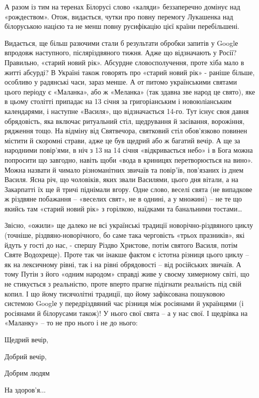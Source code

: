 А разом із тим на теренах Білорусі слово «каляди» беззаперечно домінує над
«рождеством». Отож, видається, чутки про повну перемогу Лукашенка над
білоруською нацією та не менш повну русифікацію цієї країни перебільшені.

Видається, ще більш разючими стали б результати обробки запитів у Googlе
впродовж наступного, післяріздвяного тижня. Адже що відзначають у Росії?
Правильно, «старий новий рік». Абсурдне словосполучення, проте хіба мало в
житті абсурді? В Україні також говорять про «старий новий рік» - раніше більше,
особливо у радянські часи, зараз менше. А от питомо українськими святами цього
періоду є «Маланка», або ж «Меланка» (так здавна зве народ це свято), яке в
цьому столітті припадає на 13 січня за григоріанським і новоюліанським
календарями, і наступне «Василя», що відзначається 14-го. Тут існує своя давня
обрядовість, яка включає ритуальний стіл, щедрування й засівання, ворожіння,
рядження тощо. На відміну від Святвечора, святковий стіл обов’язково повинен
містити й скоромні страви, адже це був щедрий або ж багатий вечір. А ще за
народними повір’ями, в ніч з 13 на 14 січня «відкривається небо» і в Бога можна
попросити що завгодно, навіть щоби «вода в криницях перетворюється на вино».
Можна назвати й чимало різноманітних звичаїв та повір’їв, пов’язаних із днем
Василя. Ясна річ, що чоловіків, яких звали Василями, цього дня вітали, а на
Закарпатті їх ще й тричі піднімали вгору. Одне слово, веселі свята (не
випадкове ж різдвяне побажання – «веселих свят», не в однині, а у множині) – не
те що якийсь там «старий новий рік» з горілкою, наїдками та банальними тостами…

Звісно, «ожили» ще далеко не всі українські традиції новорічно-різдвяного циклу
(точніше, різдвяно-новорічного, бо саме така черговість «трьох празників», які
йдуть у гості до нас, - спершу Різдво Христове, потім святого Василя, потім
Святе Водохреще). Проте так чи інакше фактом є істотна різниця цього циклу – як
на лексичному рівні, так і на рівні обрядовості – від російських звичаїв. А
тому Путін з його «одним народом» справді живе у своєму химерному світі, що не
стикується з реальністю, проте вперто прагне підігнати реальність під свій
копил. І що йому тисячолітні традиції, що йому зафіксована пошуковою системою
Googlе у передріздвяний час різниця між росіянами й українцями (і росіянами й
білорусами також)! У нього свої свята – а у нас свої. І щедрівка на «Маланку» –
то не про нього і не до нього:

Щедрий вечір,

Добрий вечір,

Добрим людям

На здоров’я...
